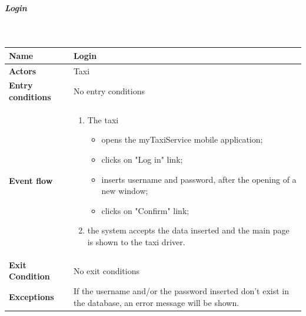 		\subparagraph{Login}
		~\\[0.2cm]
		\vspace{20pt}
		\noindent
		\begin{tabular}{l l}
		 \textbf {Name} & Login  \\ \hline
		 \textbf{Actors} & Taxi \\ \hline
		 \textbf{Entry conditions} & No entry conditions \\ \hline
		 \textbf{Event flow} & 
		 \parbox{0.7\textwidth}{
		 \begin{enumerate}
		 \item The taxi
		    \begin{itemize}
		    \item opens the myTaxiService mobile application;
		    \item clicks on "Log in" link;
		    \item inserts username and password, after the opening of a new window;
		    \item clicks on "Confirm" link;
		    \end{itemize}
		 \item the system accepts the data inserted and the main page is shown to the taxi driver.
		 \end{enumerate}
		 } \\ \hline
		 \textbf{Exit Condition} & No exit conditions \\ \hline
		 \textbf{Exceptions} & \parbox{0.7\textwidth}{If the username and/or the password inserted don't exist in the database, an error message will be shown.}
		\end{tabular}
		
